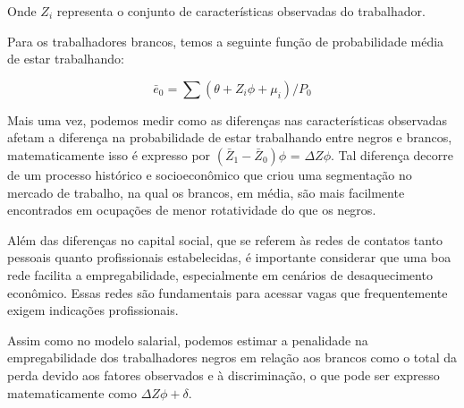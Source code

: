 \documentclass{article}
\begin{document}
	Onde  $ Z_{i}$ representa o conjunto de características observadas do trabalhador. \newline
	
	Para os trabalhadores brancos, temos a seguinte função de probabilidade média de estar trabalhando:
	
	\begin{equation}
		\bar{e}_{0} = \sum (\theta + Z_{i}\phi + \mu_{i})/ P_{0}
	\end{equation}
	
	Mais uma vez, podemos medir como as diferenças nas características observadas afetam a diferença na probabilidade de estar trabalhando entre negros e brancos, matematicamente isso é expresso por $(\bar{Z}_{1} - \bar{Z}_{0})\phi$ = $\Delta Z\phi$. Tal diferença decorre de um processo histórico e socioeconômico que criou uma segmentação no mercado de trabalho, na qual os brancos, em média, são mais facilmente encontrados em ocupações de menor rotatividade do que os negros. \newline
	
	Além das diferenças no capital social, que se referem às redes de contatos tanto pessoais quanto profissionais estabelecidas, é importante considerar que uma boa rede facilita a empregabilidade, especialmente em cenários de desaquecimento econômico. Essas redes são fundamentais para acessar vagas que frequentemente exigem indicações profissionais. \newline
	
	Assim como no modelo salarial, podemos estimar a penalidade na empregabilidade dos trabalhadores negros em relação aos brancos como o total da perda devido aos fatores observados e à discriminação, o que pode ser expresso matematicamente como $\Delta Z\phi + \delta$. 
	
\end{document}
